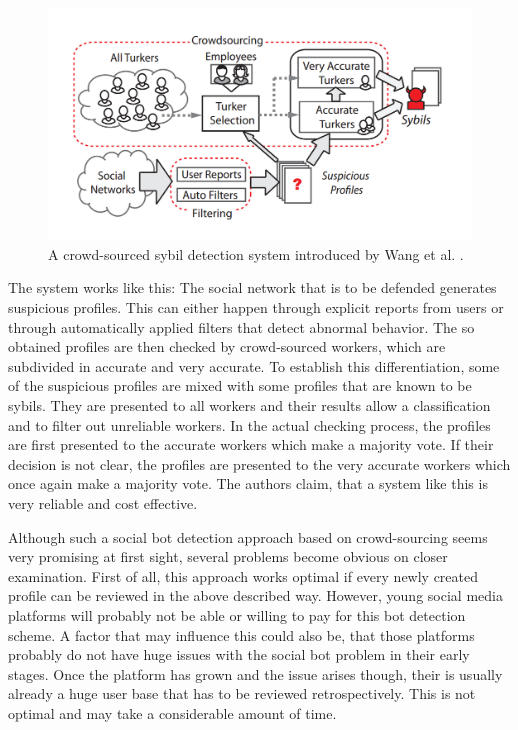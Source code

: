 \begin{figure}
	\centering
	\includegraphics[scale=0.4]{fig/crowdsys}
	\caption{A crowd-sourced sybil detection system introduced by Wang et al. \cite{wangcrowd}.}
	\label{crowdsys}
\end{figure}

The system works like this: The social network that is to be defended generates suspicious profiles. This can either happen through explicit reports from users or through automatically applied filters that detect abnormal behavior. The so obtained profiles are then checked by crowd-sourced workers, which are subdivided in accurate and very accurate. To establish this differentiation, some of the suspicious profiles are mixed with some profiles that are known to be sybils. They are presented to all workers and their results allow a classification and to filter out unreliable workers. In the actual checking process, the profiles are first presented to the accurate workers which make a majority vote. If their decision is not clear, the profiles are presented to the very accurate workers which once again make a majority vote. 
The authors claim, that a system like this is very reliable and cost effective. 

Although such a social bot detection approach based on crowd-sourcing seems very promising at first sight, several problems become obvious on closer examination. First of all, this approach works optimal if every newly created profile can be reviewed in the above described way. However, young social media platforms will probably not be able or willing to pay for this bot detection scheme. A factor that may influence this could also be, that those platforms probably do not have huge issues with the social bot problem in their early stages. Once the platform has grown and the issue arises though, their is usually already a huge user base that has to be reviewed retrospectively. This is not optimal and may take a considerable amount of time.

